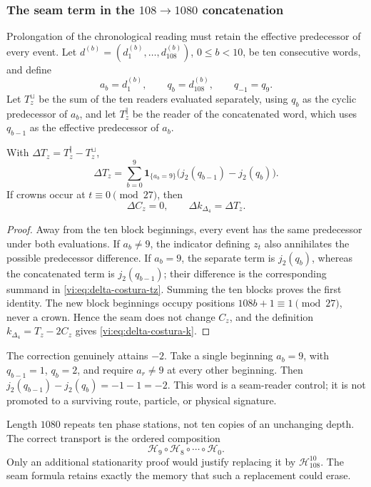 \subsubsection{The seam term in the \(108\to1080\) concatenation}
\label{vi:subsubsec:costura-108-1080}

Prolongation of the chronological reading must retain the effective
predecessor of every event. Let
\(d^{(b)}=(d^{(b)}_1,\ldots,d^{(b)}_{108})\), \(0\le b<10\), be ten
consecutive words, and define
\[
 a_b=d^{(b)}_1,\qquad q_b=d^{(b)}_{108},\qquad q_{-1}=q_9.
\]
Let \(T_z^{\sqcup}\) be the sum of the ten readers evaluated separately,
using \(q_b\) as the cyclic predecessor of \(a_b\), and let
\(T_z^{\Vert}\) be the reader of the concatenated word, which uses
\(q_{b-1}\) as the effective predecessor of \(a_b\).

\begin{lemma}
\label{vi:lem:costura-108-1080}
With \(\Delta T_z=T_z^{\Vert}-T_z^{\sqcup}\),
\begin{equation}
 \Delta T_z=
 \sum_{b=0}^{9}\mathbf1_{\{a_b=9\}}
 \bigl(j_2(q_{b-1})-j_2(q_b)\bigr).
 \label{vi:eq:delta-costura-tz}
\end{equation}
If crowns occur at \(t\equiv0\pmod{27}\), then
\begin{equation}
 \Delta C_z=0,
 \qquad
 \Delta k_{\Delta_4}=\Delta T_z.
 \label{vi:eq:delta-costura-k}
\end{equation}
\end{lemma}

\begin{proof}
Away from the ten block beginnings, every event has the same predecessor
under both evaluations. If \(a_b\ne9\), the indicator defining \(z_t\)
also annihilates the possible predecessor difference. If \(a_b=9\), the
separate term is \(j_2(q_b)\), whereas the concatenated term is
\(j_2(q_{b-1})\); their difference is the corresponding summand in
\eqref{vi:eq:delta-costura-tz}. Summing the ten blocks proves the first
identity. The new block beginnings occupy positions
\(108b+1\equiv1\pmod{27}\), never a crown. Hence the seam does not
change \(C_z\), and the definition
\(k_{\Delta_4}=T_z-2C_z\) gives
\eqref{vi:eq:delta-costura-k}.
\end{proof}

The correction genuinely attains \(-2\). Take a single beginning
\(a_b=9\), with \(q_{b-1}=1\), \(q_b=2\), and require
\(a_r\ne9\) at every other beginning. Then
\(j_2(q_{b-1})-j_2(q_b)=-1-1=-2\). This word is a seam-reader control;
it is not promoted to a surviving route, particle, or physical signature.

Length \(1080\) repeats ten phase stations, not ten copies of an
unchanging depth. The correct transport is the ordered composition
\[
 \mathcal H_9\circ\mathcal H_8\circ\cdots\circ\mathcal H_0.
\]
Only an additional stationarity proof would justify replacing it by
\(\mathcal H_{108}^{10}\). The seam formula retains exactly the memory
that such a replacement could erase.
